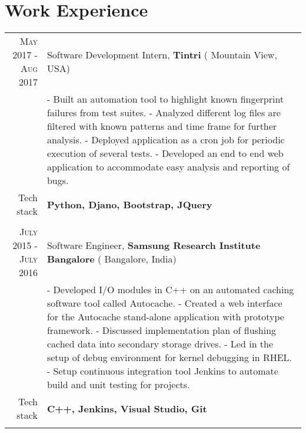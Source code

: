 \section {Work Experience}
\renewcommand{\arraystretch}{0.95}%
\begin{tabular}{r|p{14cm}}
\textsc{May 2017 - Aug 2017} & Software Development Intern, \textbf{Tintri} ( Mountain View, USA)\\
& \small{
- Built an automation tool to highlight known fingerprint failures from test suites. \newline
- Analyzed different log files are filtered with known patterns and time frame for further analysis.\newline
- Deployed application as a cron job for periodic execution of several tests.\newline
- Developed an end to end web application to accommodate easy analysis and reporting of bugs.} \\
\small{Tech stack} &\footnotesize{\textbf{Python, Djano, Bootstrap, JQuery}} \\
\multicolumn{2}{c}{} \\

\textsc{July 2015 - July 2016} & Software Engineer, \textbf{Samsung Research Institute Bangalore} ( Bangalore, India) \\
& \small{
- Developed I/O modules in C++ on an automated caching software tool called Autocache.\newline
- Created a web interface for the Autocache stand-alone application with prototype framework.\newline
- Discussed implementation plan of flushing cached data into secondary storage drives.\newline
- Led in the setup of debug environment for kernel debugging in RHEL. \newline
- Setup continuous integration tool Jenkins to automate build and unit testing for projects.}\\
\small{Tech stack} &\footnotesize{\textbf{C++, Jenkins, Visual Studio, Git}} \\
\multicolumn{2}{c}{} \\




\end{tabular}
